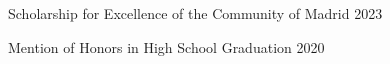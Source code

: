



\begin{cvhonors}

	\cvhonor%
	{Scholarship for Excellence of the Community of Madrid} %
	{} %
	{} %
	{2023} %

	\cvhonor%
	{Mention of Honors in High School Graduation} %
	{} %
	{} %
	{2020} %

\end{cvhonors}
